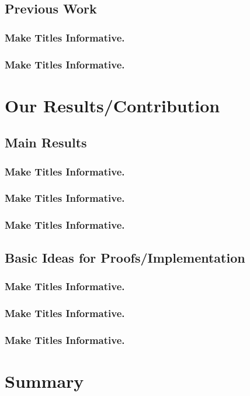 \documentclass{beamer}
\begin{document}
\subsection{Previous Work}

\begin{frame}
  \frametitle{Make Titles Informative.}
\end{frame}

\begin{frame}
  \frametitle{Make Titles Informative.}
\end{frame}



\section{Our Results/Contribution}

\subsection{Main Results}

\begin{frame}
  \frametitle{Make Titles Informative.}
\end{frame}

\begin{frame}
  \frametitle{Make Titles Informative.}
\end{frame}

\begin{frame}
  \frametitle{Make Titles Informative.}
\end{frame}


\subsection{Basic Ideas for Proofs/Implementation}

\begin{frame}
  \frametitle{Make Titles Informative.}
\end{frame}

\begin{frame}
  \frametitle{Make Titles Informative.}
\end{frame}

\begin{frame}
  \frametitle{Make Titles Informative.}
\end{frame}




\section*{Summary}
\end{document}
